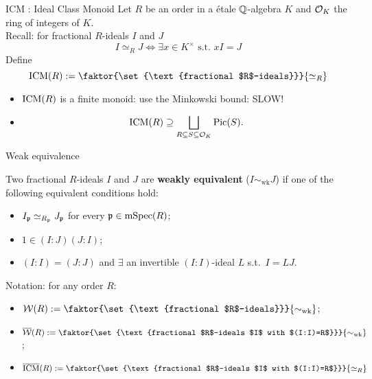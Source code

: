 \documentclass[handout]{beamer}
\begin{document}
\begin{frame}{ICM : Ideal Class Monoid}
Let $R$ be an order in a \'etale  $\mathbb{Q}$-algebra $K$ and ${\mathcal O}_K$ the ring of integers of $K$.\\
Recall: for fractional $R$-ideals $I$ and $J$
\[ I\simeq_R J \Longleftrightarrow \exists x \in K^\times \text{ s.t.~} xI=J \]
Define 
\[\ICM(R) := \faktor{\set{\text{fractional $R$-ideals}}}{\simeq_R}\]
\pause \begin{itemize}
 \item $\operatorname{ICM}(R)$ is a finite monoid: use the Minkowski bound: SLOW!

\item\[ \operatorname{ICM}(R) \supseteq \bigsqcup_{R\subseteq S \subseteq {\mathcal O}_K} \operatorname{Pic}(S).\]
\end{itemize}
\end{frame}

\begin{frame}{ Weak equivalence }
\begin{theorem}
 Two fractional $R$-ideals $I$ and $J$ are \textbf{weakly equivalent} ($I\sim_{\text{wk}} J$) if one of the following equivalent conditions hold:
 \begin{itemize}
  \item $I_{\mathfrak p}\simeq_{R_{\mathfrak p}} J_{\mathfrak p}$ for every ${\mathfrak p}\in \operatorname{mSpec}(R)$;
  \item $1\in (I:J)(J:I)$;
  \item $(I:I)=(J:J)$ and $\exists$ an invertible $(I:I)$-ideal $L$ s.t.~$I=LJ$.
 \end{itemize}
\end{theorem}

\pause Notation: for any order $R$:
\begin{itemize}
 \item $\cW(R):= \faktor{\set{\text{fractional $R$-ideals}}}{\sim_{\text{wk}}} $;
 \item $\overline\cW(R):= \faktor{\set{\text{fractional $R$-ideals $I$ with $(I:I)=R$}}}{\sim_{\text{wk}}} $;
 \item $\overline\ICM(R):= \faktor{\set{\text{fractional $R$-ideals $I$ with $(I:I)=R$}}}{\simeq_R} $
\end{itemize}
\end{frame}
\end{document}

